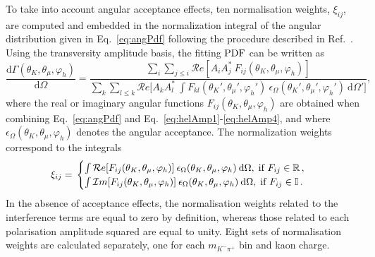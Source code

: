 \documentclass[12pt,a4paper]{article}
\def\thetamu{\ensuremath{\theta_{\mu}}\xspace}
\def\phihel{\ensuremath{\varphi_{h}}\xspace}
\newcommand{\mkpi}{\ensuremath{m_{\Km\pip}}\xspace}
\newcommand{\Km}{\ensuremath{K^-}\xspace}
\newcommand{\pip}{\ensuremath{\pi^+}\xspace}
\newcommand{\pdf}{\ensuremath{{\rm PDF}}\xspace}
\newcommand{\equref}[1]{Eq.~\ref{#1}}
\begin{document}
To take into account angular acceptance effects, ten normalisation weights, $\xi_{ij}$, are computed and embedded in the normalization integral of the angular distribution given in Eq.~\ref{eq:angPdf} following the procedure described in Ref.~\cite{TristansThesis}. Using the transversity amplitude basis, the fitting \pdf can be written as
\begin{equation}
\label{eq:angNormPdf}
\frac{\text{d}\Gamma(\theta_K,\thetamu,\phihel)}{\text{d}\Omega} = \frac{\sum_{i}\sum_{j \leq i}{\mathcal{R}e{[A_{i}A_{j}^{*}\:F_{ij}(\theta_K,\thetamu,\phihel)]}}}{\sum_{k}\sum_{l \leq k}{\mathcal{R}e{[A_{k} A_{l}^{*}\: \int{F_{kl}(\theta_K',\thetamu',\phihel')\:\epsilon_{\Omega}(\theta_K',\thetamu',\phihel')\:\text{d}\Omega'}}]}},
\end{equation}
where the real or imaginary angular functions $F_{ij}(\theta_K,\thetamu,\phihel)$ are obtained when combining \equref{eq:angPdf} and Eq.~\ref{eq:helAmp1}-\ref{eq:helAmp4}, and where $\epsilon_{\Omega}(\theta_K,\thetamu,\phihel)$ denotes the angular acceptance. The normalization weights correspond to the integrals
\begin{equation}
\label{eq:normWeights}
\xi_{ij} = \\
\begin{cases}
\int{\mathcal{R}e[F_{ij}(\theta_K,\thetamu,\phihel)]\:\epsilon_{\Omega}(\theta_K,\thetamu,\phihel)\:\text{d}\Omega},\; \text{if } F_{ij}\in\mathbb{R}  \,,\\
\int{\mathcal{I}m[F_{ij}(\theta_K,\thetamu,\phihel)]\:\epsilon_{\Omega}(\theta_K,\thetamu,\phihel)\:\text{d}\Omega},\; \text{if } F_{ij}\in\mathbb{I}  \,.\\
\end{cases}
\end{equation}
In the absence of acceptance effects, the normalisation weights related to the interference terms are equal to zero by definition, 
whereas those related to each polarisation amplitude squared are equal to unity.
Eight sets of normalisation weights are calculated separately, one for each \mkpi bin and kaon charge.
\end{document}
